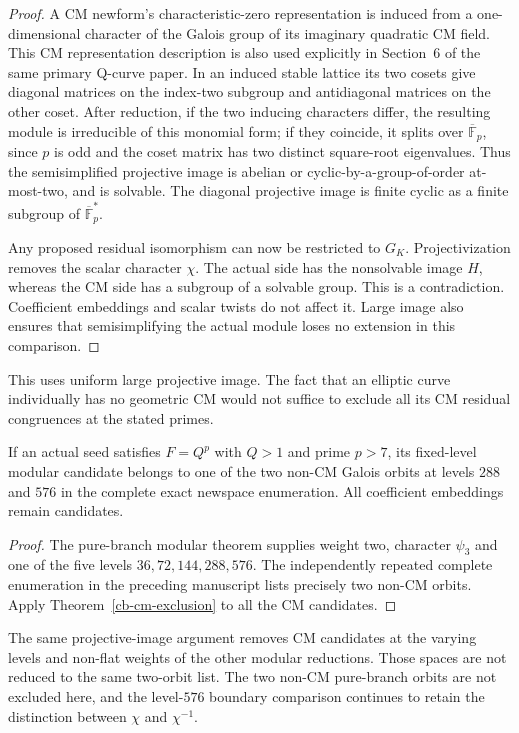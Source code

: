 \begin{proof}
A CM newform's characteristic-zero representation is induced from a
one-dimensional character of the Galois group of its imaginary
quadratic CM field. This CM representation description is also used
explicitly in Section~6 of the same primary Q-curve paper. In an
induced stable lattice its two cosets give diagonal matrices on the
index-two subgroup and antidiagonal matrices on the other coset.
After reduction, if the two inducing characters differ, the resulting
module is irreducible of this monomial form; if they coincide, it
splits over $\overline{\mathbb F}_p$, since $p$ is odd and the
coset matrix has two distinct square-root eigenvalues. Thus the
semisimplified projective image is abelian or cyclic-by-a-group-of-order
at-most-two, and is solvable. The diagonal projective image is finite
cyclic as a finite subgroup of $\overline{\mathbb F}_p^*$.

Any proposed residual isomorphism can now be restricted to $G_K$.
Projectivization removes the scalar character $\chi$. The actual side
has the nonsolvable image $H$, whereas the CM side has a subgroup
of a solvable group. This is a contradiction. Coefficient embeddings
and scalar twists do not affect it. Large image also ensures that
semisimplifying the actual module loses no extension in this comparison.
\end{proof}

This uses uniform large projective image. The fact that an elliptic
curve individually has no geometric CM would not suffice to exclude
all its CM residual congruences at the stated primes.

\begin{corollary}\label{cb-two-orbits}
If an actual seed satisfies $F=Q^p$ with $Q>1$ and prime $p>7$,
its fixed-level modular candidate belongs to one of the two non-CM
Galois orbits at levels $288$ and $576$ in the complete exact
newspace enumeration. All coefficient embeddings remain candidates.
\end{corollary}
\begin{proof}
The pure-branch modular theorem supplies weight two, character
$\psi_3$ and one of the five levels $36,72,144,288,576$.
The independently repeated complete enumeration in the preceding
manuscript lists precisely two non-CM orbits. Apply
Theorem~\ref{cb-cm-exclusion} to all the CM candidates.
\end{proof}

The same projective-image argument removes CM candidates at the
varying levels and non-flat weights of the other modular reductions.
Those spaces are not reduced to the same two-orbit list. The two
non-CM pure-branch orbits are not excluded here, and the level-$576$
boundary comparison continues to retain the distinction between
$\chi$ and $\chi^{-1}$.

